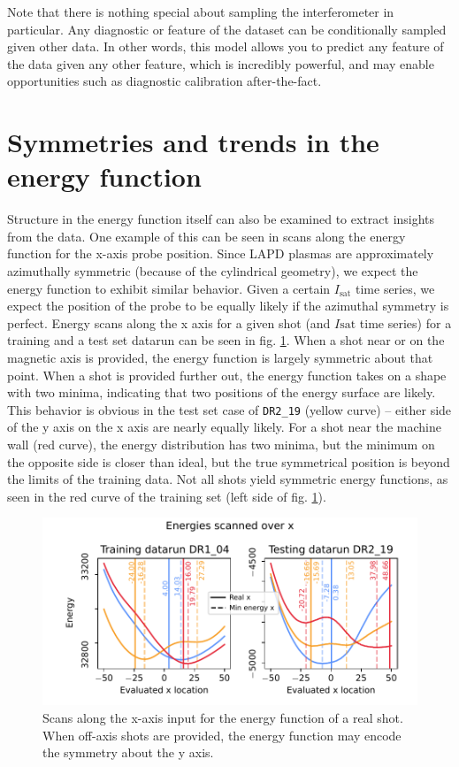 Note that there is nothing special about sampling the interferometer in particular. Any diagnostic or feature of the dataset can be conditionally sampled given other data. In other words, this model allows you to predict any feature of the data given any other feature, which is incredibly powerful, and may enable opportunities such as diagnostic calibration after-the-fact.

\section{Symmetries and trends in the energy function}

Structure in the energy function itself can also be examined to extract insights from the data. One example of this can be seen in scans along the energy function for the x-axis probe position. Since LAPD plasmas are approximately azimuthally symmetric (because of the cylindrical geometry), we expect the energy function to exhibit similar behavior. Given a certain $I_\text{sat}$ time series, we expect the position of the probe to be equally likely if the azimuthal symmetry is perfect. Energy scans along the x axis for a given shot (and $I\text{sat}$ time series) for a training and a test set datarun can be seen in fig. \ref{fig:energy_x_scan}. When a shot near or on the magnetic axis is provided, the energy function is largely symmetric about that point. When a shot is provided further out, the energy function takes on a shape with two minima, indicating that two positions of the energy surface are likely. This behavior is obvious in the test set case of \texttt{DR2\_19} (yellow curve) -- either side of the y axis on the x axis are nearly equally likely. For a shot near the machine wall (red curve), the energy distribution has two minima, but the minimum on the opposite side is closer than ideal, but the true symmetrical position is beyond the limits of the training data. Not all shots yield symmetric energy functions, as seen in the red curve of the training set (left side of fig. \ref{fig:energy_x_scan}). 

\begin{figure}
	\centering
	\includegraphics[width=400pt]{figures/energy_x_scan_train-test_39-0}
	\caption[Energy function scan along probe x coordinate]{\label{fig:energy_x_scan}Scans along the x-axis input for the energy function of a real shot. When off-axis shots are provided, the energy function may encode the symmetry about the y axis.}
\end{figure}

